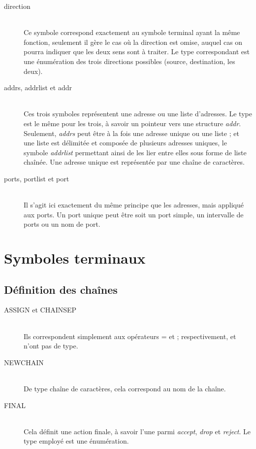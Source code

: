 \documentclass[a4paper,11pt]{report}
\newcommand{\ensp}[1]{\selectlanguage{english}#1\selectlanguage{french}}
\begin{document}
\begin{description}
  \item[direction]~\\
    Ce symbole correspond exactement au symbole terminal ayant la même
    fonction, seulement il gère le cas où la direction est omise, auquel cas
    on pourra indiquer que les deux sens sont à traiter. Le type correspondant
    est une énumération des trois directions possibles (source, destination,
    les deux).

  \item[addrs, addrlist et addr]~\\
    Ces trois symboles représentent une adresse ou une liste d'adresses. Le
    type est le même pour les trois, à savoir un pointeur vers une structure
    \emph{addr}. Seulement, \emph{addrs} peut être à la fois une adresse
    unique ou une liste ; et une liste est délimitée et composée de plusieurs
    adresses uniques, le symbole \emph{addrlist} permettant ainsi de les lier
    entre elles sous forme de liste chaînée. Une adresse unique est
    représentée par une chaîne de caractères.

  \item[ports, portlist et port]~\\
    Il s'agit ici exactement du même principe que les adresses, mais appliqué
    aux ports. Un port unique peut être soit un port simple, un intervalle de
    ports ou un nom de port.
\end{description}

\section{Symboles terminaux}

\subsection{Définition des chaînes}

\begin{description}
  \item[ASSIGN et CHAINSEP]~\\
    Ils correspondent simplement aux opérateurs \og=\fg{} et \og\ensp{;}\fg{}
    respectivement, et n'ont pas de type.

  \item[NEWCHAIN]~\\
    De type chaîne de caractères, cela correspond au nom de la chaîne.

  \item[FINAL]~\\
    Cela définit une \og action finale\fg, à savoir l'une parmi \emph{accept},
    \emph{drop} et \emph{reject}. Le type employé est une énumération.
\end{description}
\end{document}
